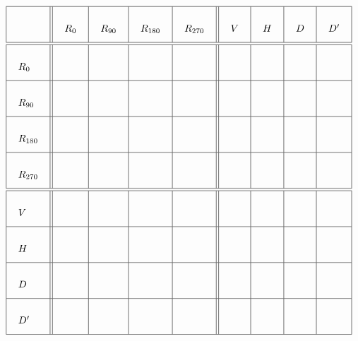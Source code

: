 \begin{prob}
{\[\arraycolsep=12pt\def\arraystretch{3}
\begin{array}{|l||l|l|l|l||l|l|l|l|}
\hline
 & R_0 & R_{90} & R_{180} & R_{270} & V & H & D & D' \\ \hline\hline
R_0 & & & & & & & & \\ \hline
R_{90} & & & & & & & & \\ \hline
R_{180} & & & & & & & & \\ \hline
R_{270} & & & & & & & & \\ \hline\hline
V & & & & & & & & \\ \hline
H & & & & & & & & \\ \hline
D & & & & & & & & \\ \hline
D' & & & & & & & & \\ \hline
\end{array}
\]}
\end{prob}



